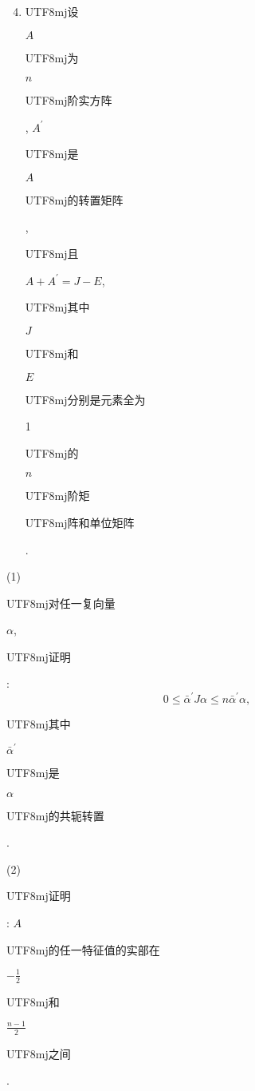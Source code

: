 \documentclass[10pt]{article}
\begin{document}
\begin{enumerate}
  \setcounter{enumi}{3}
  \item \begin{CJK}{UTF8}{mj}设\end{CJK} $A$ \begin{CJK}{UTF8}{mj}为\end{CJK} $n$ \begin{CJK}{UTF8}{mj}阶实方阵\end{CJK}, $A^{\prime}$ \begin{CJK}{UTF8}{mj}是\end{CJK} $A$ \begin{CJK}{UTF8}{mj}的转置矩阵\end{CJK}, \begin{CJK}{UTF8}{mj}且\end{CJK} $A+A^{\prime}=J-E$, \begin{CJK}{UTF8}{mj}其中\end{CJK} $J$ \begin{CJK}{UTF8}{mj}和\end{CJK} $E$ \begin{CJK}{UTF8}{mj}分别是元素全为\end{CJK} 1 \begin{CJK}{UTF8}{mj}的\end{CJK} $n$ \begin{CJK}{UTF8}{mj}阶矩\end{CJK} \begin{CJK}{UTF8}{mj}阵和单位矩阵\end{CJK}.
\end{enumerate}
(1) \begin{CJK}{UTF8}{mj}对任一复向量\end{CJK} $\alpha$, \begin{CJK}{UTF8}{mj}证明\end{CJK}:
$$
0 \leqslant \bar{\alpha}^{\prime} J \alpha \leqslant n \bar{\alpha}^{\prime} \alpha,
$$
\begin{CJK}{UTF8}{mj}其中\end{CJK} $\bar{\alpha}^{\prime}$ \begin{CJK}{UTF8}{mj}是\end{CJK} $\alpha$ \begin{CJK}{UTF8}{mj}的共轭转置\end{CJK}.

(2) \begin{CJK}{UTF8}{mj}证明\end{CJK}: $A$ \begin{CJK}{UTF8}{mj}的任一特征值的实部在\end{CJK} $-\frac{1}{2}$ \begin{CJK}{UTF8}{mj}和\end{CJK} $\frac{n-1}{2}$ \begin{CJK}{UTF8}{mj}之间\end{CJK}.
\end{document}
